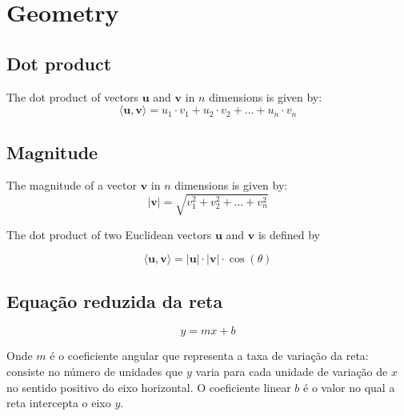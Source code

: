 \section{Geometry}

















\subsection{Dot product}
The dot product of vectors $\mathbf{u}$ and $\mathbf{v}$ in $n$ dimensions is given by:
\[
    \langle \mathbf{u}, \mathbf{v} \rangle = u_1 \cdot v_1 + u_2 \cdot v_2 + \ldots + u_n \cdot v_n
\]

\subsection{Magnitude}
The magnitude of a vector $\mathbf{v}$ in $n$ dimensions is given by:
\[
    |\mathbf{v}| = \sqrt{v_1^2 + v_2^2 + \ldots + v_n^2}
\]

The dot product of two Euclidean vectors $\mathbf{u}$ and $\mathbf{v}$ is defined by

\[
    \langle \mathbf{u}, \mathbf{v} \rangle = |\mathbf{u}| \cdot |\mathbf{v}| \cdot \cos(\theta)
\]

\subsection{Equação reduzida da reta}

\begin{equation}
    y = mx + b
\end{equation}

Onde $m$ é o coeficiente angular que representa a taxa de variação da reta: consiste no número de
unidades que $y$ varia para cada unidade de variação de $x$ no sentido positivo do eixo
horizontal. O coeficiente linear $b$ é o valor no qual a reta intercepta o eixo $y$.

